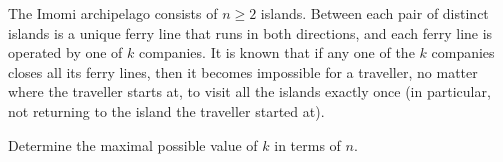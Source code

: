 The Imomi archipelago consists of $n \geq 2$ islands. Between each pair of distinct islands is a unique ferry line that runs in both directions, and each ferry line is operated by one of $k$ companies. It is known that if any one of the $k$ companies closes all its ferry lines, then it becomes impossible for a traveller, no matter where the traveller starts at, to visit all the islands exactly once (in particular, not returning to the island the traveller started at).

Determine the maximal possible value of $k$ in terms of $n$.
